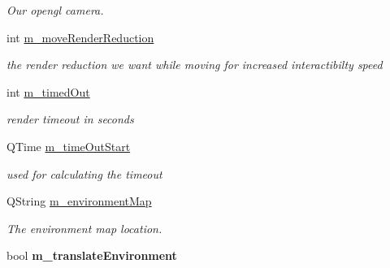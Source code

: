 \begin{DoxyCompactItemize}
\begin{DoxyCompactList}\small\item\em Our opengl camera. \end{DoxyCompactList}\item 
\hypertarget{class_open_g_l_widget_a266b96d06009d874306ceccef9c74c90}{int \hyperlink{class_open_g_l_widget_a266b96d06009d874306ceccef9c74c90}{m\-\_\-move\-Render\-Reduction}}\label{class_open_g_l_widget_a266b96d06009d874306ceccef9c74c90}

\begin{DoxyCompactList}\small\item\em the render reduction we want while moving for increased interactibilty speed \end{DoxyCompactList}\item 
\hypertarget{class_open_g_l_widget_a3cb0163f8ae63ad8a6da577a8c43a815}{int \hyperlink{class_open_g_l_widget_a3cb0163f8ae63ad8a6da577a8c43a815}{m\-\_\-timed\-Out}}\label{class_open_g_l_widget_a3cb0163f8ae63ad8a6da577a8c43a815}

\begin{DoxyCompactList}\small\item\em render timeout in seconds \end{DoxyCompactList}\item 
\hypertarget{class_open_g_l_widget_a5313ea8cebfeb65d70d774da00223436}{Q\-Time \hyperlink{class_open_g_l_widget_a5313ea8cebfeb65d70d774da00223436}{m\-\_\-time\-Out\-Start}}\label{class_open_g_l_widget_a5313ea8cebfeb65d70d774da00223436}

\begin{DoxyCompactList}\small\item\em used for calculating the timeout \end{DoxyCompactList}\item 
\hypertarget{class_open_g_l_widget_a996442b4e1ffbfccd74bee8a960e1d13}{Q\-String \hyperlink{class_open_g_l_widget_a996442b4e1ffbfccd74bee8a960e1d13}{m\-\_\-environment\-Map}}\label{class_open_g_l_widget_a996442b4e1ffbfccd74bee8a960e1d13}

\begin{DoxyCompactList}\small\item\em The environment map location. \end{DoxyCompactList}\item 
\hypertarget{class_open_g_l_widget_a07def2c259a4cbd2e8c11de95aaeb567}{bool {\bfseries m\-\_\-translate\-Environment}}\label{class_open_g_l_widget_a07def2c259a4cbd2e8c11de95aaeb567}

\end{DoxyCompactItemize}


